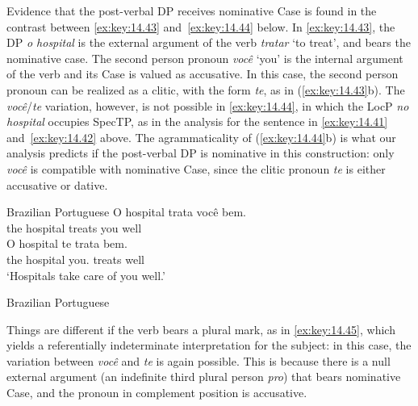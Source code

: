 \documentclass[output=paper]{langsci/langscibook}
\begin{document}
Evidence that the post-verbal DP receives nominative Case is found in the
contrast between \eqref{ex:key:14.43} and~\eqref{ex:key:14.44} below. In
\eqref{ex:key:14.43}, the DP \emph{o hospital} is the external argument of the
verb \emph{tratar} ‘to treat’, and bears the nominative case. The second person
pronoun \emph{você} ‘you’ is the internal argument of the verb and its Case is
valued as accusative. In this case, the second person pronoun can be realized
as a clitic, with the form \emph{te}, as in (\eqref{ex:key:14.43}b). The
\emph{você}/\emph{te} variation, however, is not possible in
\eqref{ex:key:14.44}, in which the LocP \emph{no hospital} occupies SpecTP, as
in the analysis for the sentence in \eqref{ex:key:14.41}
and~\eqref{ex:key:14.42} above. The agrammaticality of (\eqref{ex:key:14.44}b) is
what our analysis predicts if the post-verbal DP is nominative in this
construction: only \emph{você} is compatible with nominative Case, since the
clitic pronoun \emph{te} is either accusative or dative.

\ea\label{ex:key:14.43}Brazilian Portuguese
    \ea
    \gll    O hospital trata você bem.\\
            the hospital treats you well\\
    \ex
    \gll    O hospital te trata bem.\\
            the hospital you.\Acc{} treats well\\
    \glt    ‘Hospitals take care of you well.’
    \z
\z

\ea\label{ex:key:14.44}Brazilian Portuguese
    \z
\z

Things are different if the verb bears a plural mark, as in
\eqref{ex:key:14.45}, which yields a referentially indeterminate interpretation
for the subject: in this case, the variation between \emph{você} and \emph{te}
is again possible. This is because there is a null external argument (an
indefinite third plural person \emph{pro}) that bears nominative Case, and the
pronoun in complement position is accusative.
\end{document}
